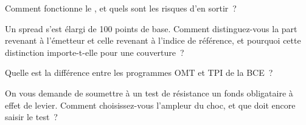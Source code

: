 \begin{interviewq}\label{iq:m2:european-and-japanese-government-bonds:3}
Comment fonctionne le , et quels sont les risques d'en sortir~?
\end{interviewq}

\begin{interviewq}\label{iq:m2:european-and-japanese-government-bonds:4}
Un spread s'est élargi de 100 points de base. Comment distinguez-vous la part revenant à l'émetteur
et celle revenant à l'indice de référence, et pourquoi cette distinction importe-t-elle pour une couverture~?
\end{interviewq}

\begin{interviewq}\label{iq:m2:european-and-japanese-government-bonds:5}
Quelle est la différence entre les programmes OMT et TPI de la BCE~?
\end{interviewq}

\begin{interviewq}\label{iq:m2:european-and-japanese-government-bonds:6}
On vous demande de soumettre à un test de résistance un fonds obligataire à effet de levier. Comment choisissez-vous
l'ampleur du choc, et que doit encore saisir le test~?
\end{interviewq}

